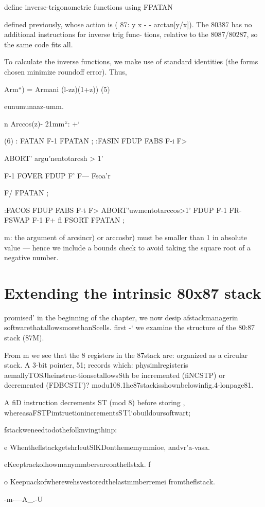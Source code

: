 {{{{ define inverse-trigonometric functions using FPATAN

defined previously, whose action is ( 87: y x - - arctan[y/x]).
The 80387 has no additional instructions for inverse trig func-
tions, relative to the 8087/80287, so the same code fits all.

To calculate the inverse functions, we make use of standard
identities (the forms chosen minimize roundoff error). Thus,

Arm“) = Armani (l-zz)(1+z)) (5)

eunumunaaz-umm.

n
Arccos(z)- 21mm“: +‘ } (6)
: FATAN F-1 FPATAN ;
:FASIN FDUP FABS F-i F>

ABORT' argu'nentotarcsh > 1'

F-1 FOVER FDUP F' F— Fsoa'r

F/ FPATAN ;

:FACOS FDUP FABS F-t F>
ABORT'uwmentotarccos>1'
FDUP F-1 FR- FSWAP F-1 F+ fl
FSORT FPATAN ;

m: the argument of arcsincr) or arccosbr) must be smaller than
1 in absolute value — hence we include a bounds check to avoid
taking the square root of a negative number.

 

\section{Extending the intrinsic 80x87 stack}
 promised' in the beginning of the chapter, we now desip
afstackmanagerin softwarethatallowsmorethanScells. first -‘
we examine the structure of the 80:87 stack (87M).

From m we see that the 8 registers in the 87stack are:
organized as a circular stack. A 3-bit pointer, 51; records which:
physimlregisteris aemallyTOSJheinstruc-tionsetallowsSth
be incremented (fiNCSTP) or decremented (FDBCSTI’)?
modu108.1he87stackisshownbelowinfig.4-lonpage81.

A fiD instruction decrements ST (mod 8) before storing ,
whereasaFSTPimtruetionincrementsS’I'l‘obuildoursoftwart;

fstackweneedtodothefolknvingthinp:

e WhentheflstackgetshrleutSlKDonthememymmioe,
andvr'a-vasa.

eKeeptraekolhowmanymmbersareontheflstxk. f

o Keepuackofwherewehsvestoredthelastmmberremei
fromtheflstack.

-m-—A_.-U

}}}
